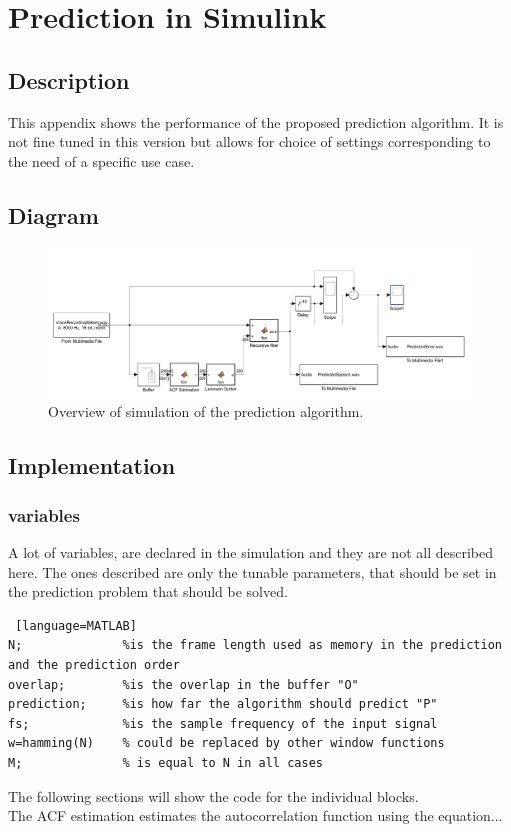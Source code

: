 
\section{Prediction in Simulink}


\subsection{Description}
This appendix shows the performance of the proposed prediction algorithm. It is not fine tuned in this version but allows for choice of settings corresponding to the need of a specific use case.  


\subsection{Diagram}
\begin{figure} [h]
	\centering
	\includegraphics[width=\textwidth]{../Journal/Code/SimulinkPrediction}
	\caption{Overview of simulation of the prediction algorithm.}
	\label{Fig:PredictionSimulink}
\end{figure}


\subsection{Implementation}

\subsubsection{variables}
A lot of variables, are declared in the simulation and they are not all described here. The ones described are only the tunable parameters, that should be set in the prediction problem that should be solved. 
\begin{lstlisting} [language=MATLAB]
N; 				%is the frame length used as memory in the prediction and the prediction order
overlap;		%is the overlap in the buffer "O"
prediction; 	%is how far the algorithm should predict "P"
fs; 			%is the sample frequency of the input signal 
w=hamming(N)	% could be replaced by other window functions
M;				% is equal to N in all cases
\end{lstlisting}
The following sections will show the code for the individual blocks. \\
The ACF estimation estimates the autocorrelation function using the equation...
